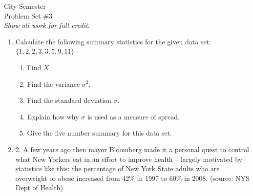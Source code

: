 \documentclass[12pt]{article}
\theoremstyle{plain}     %
\begin{document}
\large
City Semester%
\\
Problem Set \#3\\
\normalsize 
\emph{Show all work for full credit.}\\
\begin{enumerate}
	\item Calculate the following summary statistics for the given data set: $\{1,2,2,3,3,5,9,11\}$
		\begin{enumerate}
			\item Find $\overline{X}$.
			\item Find the variance $\sigma^2$.
			\item Find the standard deviation $\sigma$.
			\item Explain how why $\sigma$ is used as a measure of spread.
			\item Give the five number summary for this data set.
			
		\end{enumerate}
	
	\item 2.	A few years ago then mayor Bloomberg made it a personal quest to control what New Yorkers eat in an effort to improve health – largely motivated by statistics like this: the percentage of New York State adults who are overweight or obese increased from 42\% in 1997 to 60\% in 2008. 
(source: NYS Dept of Health)


\end{enumerate}
\end{document}
